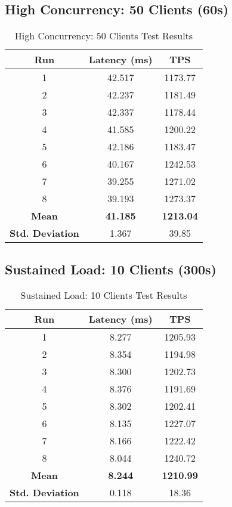 \subsection{High Concurrency: 50 Clients (60s)}
\begin{table}[H]
\centering
\begin{tabular}{|c|c|c|}
\hline
\textbf{Run} & \textbf{Latency (ms)} & \textbf{TPS} \\
\hline
1 & 42.517 & 1173.77 \\
2 & 42.237 & 1181.49 \\
3 & 42.337 & 1178.44 \\
4 & 41.585 & 1200.22 \\
5 & 42.186 & 1183.47 \\
6 & 40.167 & 1242.53 \\
7 & 39.255 & 1271.02 \\
8 & 39.193 & 1273.37 \\
\hline
\textbf{Mean} & \textbf{41.185} & \textbf{1213.04} \\
\textbf{Std. Deviation} & 1.367 & 39.85 \\
\hline
\end{tabular}
\caption{High Concurrency: 50 Clients Test Results}
\end{table}

\subsection{Sustained Load: 10 Clients (300s)}
\begin{table}[H]
\centering
\begin{tabular}{|c|c|c|}
\hline
\textbf{Run} & \textbf{Latency (ms)} & \textbf{TPS} \\
\hline
1 & 8.277 & 1205.93 \\
2 & 8.354 & 1194.98 \\
3 & 8.300 & 1202.73 \\
4 & 8.376 & 1191.69 \\
5 & 8.302 & 1202.41 \\
6 & 8.135 & 1227.07 \\
7 & 8.166 & 1222.42 \\
8 & 8.044 & 1240.72 \\
\hline
\textbf{Mean} & \textbf{8.244} & \textbf{1210.99} \\
\textbf{Std. Deviation} & 0.118 & 18.36 \\
\hline
\end{tabular}
\caption{Sustained Load: 10 Clients Test Results}
\end{table}

